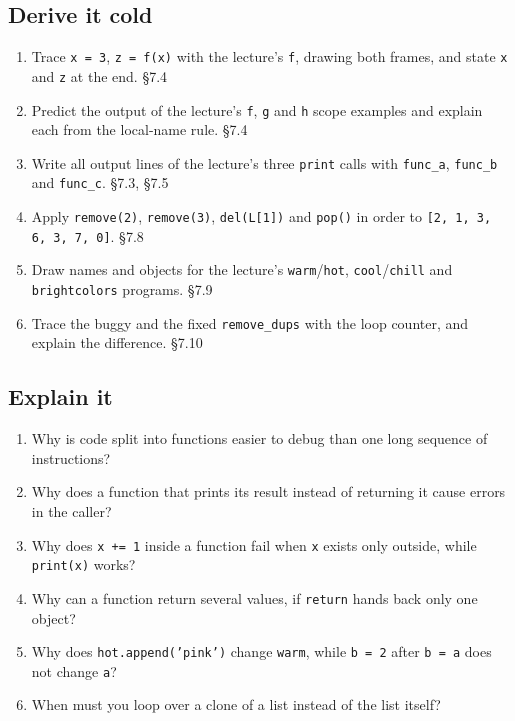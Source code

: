 \documentclass[11pt]{article}
\begin{document}
\begin{keepsection}
\section{Derive it cold}

\begin{enumerate}
\item Trace \texttt{x = 3}, \texttt{z = f(x)} with the lecture’s \texttt{f}, drawing both frames, and state \texttt{x} and \texttt{z} at the end. \hfill{\small\color{FAUblue}§7.4}
\item Predict the output of the lecture’s \texttt{f}, \texttt{g} and \texttt{h} scope examples and explain each from the local-name rule. \hfill{\small\color{FAUblue}§7.4}
\item Write all output lines of the lecture’s three \texttt{print} calls with \texttt{func\_a}, \texttt{func\_b} and \texttt{func\_c}. \hfill{\small\color{FAUblue}§7.3, §7.5}
\item Apply \texttt{remove(2)}, \texttt{remove(3)}, \texttt{del(L[1])} and \texttt{pop()} in order to \texttt{[2, 1, 3, 6, 3, 7, 0]}. \hfill{\small\color{FAUblue}§7.8}
\item Draw names and objects for the lecture’s \texttt{warm}/\texttt{hot}, \texttt{cool}/\texttt{chill} and \texttt{brightcolors} programs. \hfill{\small\color{FAUblue}§7.9}
\item Trace the buggy and the fixed \texttt{remove\_dups} with the loop counter, and explain the difference. \hfill{\small\color{FAUblue}§7.10}
\end{enumerate}
\end{keepsection}

\begin{keepsection}
\section{Explain it}

\begin{enumerate}
\item Why is code split into functions easier to debug than one long sequence of instructions?
\item Why does a function that prints its result instead of returning it cause errors in the caller?
\item Why does \texttt{x += 1} inside a function fail when \texttt{x} exists only outside, while \texttt{print(x)} works?
\item Why can a function return several values, if \texttt{return} hands back only one object?
\item Why does \texttt{hot.append('pink')} change \texttt{warm}, while \texttt{b = 2} after \texttt{b = a} does not change \texttt{a}?
\item When must you loop over a clone of a list instead of the list itself?
\end{enumerate}

\end{keepsection}
\end{document}
